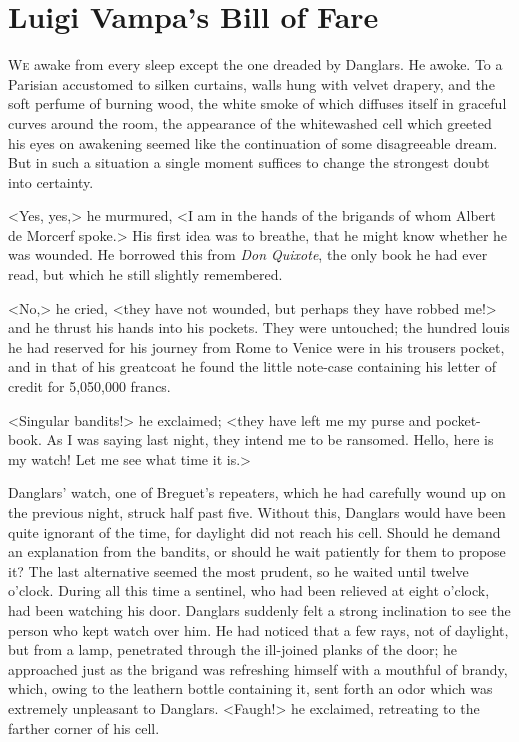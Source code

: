 \chapter{Luigi Vampa's Bill of Fare}

 \lettrine{W}{e} awake from every sleep except the one dreaded by Danglars. He awoke. To a Parisian accustomed to silken curtains, walls hung with velvet drapery, and the soft perfume of burning wood, the white smoke of which diffuses itself in graceful curves around the room, the appearance of the whitewashed cell which greeted his eyes on awakening seemed like the continuation of some disagreeable dream. But in such a situation a single moment suffices to change the strongest doubt into certainty. 

 <Yes, yes,> he murmured, <I am in the hands of the brigands of whom Albert de Morcerf spoke.> His first idea was to breathe, that he might know whether he was wounded. He borrowed this from \textit{Don Quixote}, the only book he had ever read, but which he still slightly remembered. 

 <No,> he cried, <they have not wounded, but perhaps they have robbed me!> and he thrust his hands into his pockets. They were untouched; the hundred louis he had reserved for his journey from Rome to Venice were in his trousers pocket, and in that of his greatcoat he found the little note-case containing his letter of credit for 5,050,000 francs. 

 <Singular bandits!> he exclaimed; <they have left me my purse and pocket-book. As I was saying last night, they intend me to be ransomed. Hello, here is my watch! Let me see what time it is.> 

 Danglars' watch, one of Breguet's repeaters, which he had carefully wound up on the previous night, struck half past five. Without this, Danglars would have been quite ignorant of the time, for daylight did not reach his cell. Should he demand an explanation from the bandits, or should he wait patiently for them to propose it? The last alternative seemed the most prudent, so he waited until twelve o'clock. During all this time a sentinel, who had been relieved at eight o'clock, had been watching his door.  Danglars suddenly felt a strong inclination to see the person who kept watch over him. He had noticed that a few rays, not of daylight, but from a lamp, penetrated through the ill-joined planks of the door; he approached just as the brigand was refreshing himself with a mouthful of brandy, which, owing to the leathern bottle containing it, sent forth an odor which was extremely unpleasant to Danglars. <Faugh!> he exclaimed, retreating to the farther corner of his cell. 

